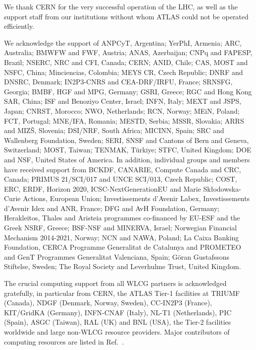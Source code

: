 

We thank CERN for the very successful operation of the LHC, as well as the
support staff from our institutions without whom ATLAS could not be
operated efficiently.

We acknowledge the support of 
ANPCyT, Argentina; 
YerPhI, Armenia; 
ARC, Australia; 
BMWFW and FWF, Austria; 
ANAS, Azerbaijan; 
CNPq and FAPESP, Brazil; 
NSERC, NRC and CFI, Canada; 
CERN; 
ANID, Chile; 
CAS, MOST and NSFC, China; 
Minciencias, Colombia; 
MEYS CR, Czech Republic; 
DNRF and DNSRC, Denmark; 
IN2P3-CNRS and CEA-DRF/IRFU, France; 
SRNSFG, Georgia; 
BMBF, HGF and MPG, Germany; 
GSRI, Greece; 
RGC and Hong Kong SAR, China; 
ISF and Benoziyo Center, Israel; 
INFN, Italy; 
MEXT and JSPS, Japan; 
CNRST, Morocco; 
NWO, Netherlands; 
RCN, Norway; 
MEiN, Poland; 
FCT, Portugal; 
MNE/IFA, Romania; 
MESTD, Serbia; 
MSSR, Slovakia; 
ARRS and MIZ\v{S}, Slovenia; 
DSI/NRF, South Africa; 
MICINN, Spain; 
SRC and Wallenberg Foundation, Sweden; 
SERI, SNSF and Cantons of Bern and Geneva, Switzerland; 
MOST, Taiwan; 
TENMAK, T\"urkiye; 
STFC, United Kingdom; 
DOE and NSF, United States of America. 
In addition, individual groups and members have received support from 
BCKDF, CANARIE, Compute Canada and CRC, Canada; 
PRIMUS 21/SCI/017 and UNCE SCI/013, Czech Republic; 
COST, ERC, ERDF, Horizon 2020, ICSC-NextGenerationEU and Marie Sk{\l}odowska-Curie Actions, European Union; 
Investissements d'Avenir Labex, Investissements d'Avenir Idex and ANR, France; 
DFG and AvH Foundation, Germany; 
Herakleitos, Thales and Aristeia programmes co-financed by EU-ESF and the Greek NSRF, Greece; 
BSF-NSF and MINERVA, Israel; 
Norwegian Financial Mechanism 2014-2021, Norway; 
NCN and NAWA, Poland; 
La Caixa Banking Foundation, CERCA Programme Generalitat de Catalunya and PROMETEO and GenT Programmes Generalitat Valenciana, Spain; 
G\"{o}ran Gustafssons Stiftelse, Sweden; 
The Royal Society and Leverhulme Trust, United Kingdom.

The crucial computing support from all WLCG partners is acknowledged gratefully, in particular from CERN, the ATLAS Tier-1 facilities at TRIUMF (Canada), NDGF (Denmark, Norway, Sweden), CC-IN2P3 (France), KIT/GridKA (Germany), INFN-CNAF (Italy), NL-T1 (Netherlands), PIC (Spain), ASGC (Taiwan), RAL (UK) and BNL (USA), the Tier-2 facilities worldwide and large non-WLCG resource providers. Major contributors of computing resources are listed in Ref.~\cite{ATL-SOFT-PUB-2021-003}.


